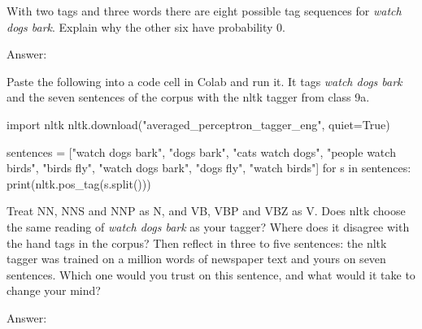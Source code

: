 \documentclass[11pt,letterpaper]{article}
\newcommand{\question}[1]{\needspace{5cm}\vspace{10pt}{\large\bfseries #1}\par\vspace{2pt}}
\begin{document}
\question{5. The other paths}

With two tags and three words there are eight possible tag sequences for \emph{watch dogs bark}. Explain why the other six have probability 0.

\par\vspace{4pt}Answer:\par\vspace{2cm}

\question{6. Comparing with nltk}

Paste the following into a code cell in Colab and run it. It tags \emph{watch dogs bark} and the seven sentences of the corpus with the nltk tagger from class 9a.

\begin{code}
import nltk
nltk.download("averaged_perceptron_tagger_eng", quiet=True)

sentences = ["watch dogs bark",
             "dogs bark", "cats watch dogs", "people watch birds", "birds fly",
             "watch dogs bark", "dogs fly", "watch birds"]
for s in sentences:
    print(nltk.pos_tag(s.split()))
\end{code}

Treat NN, NNS and NNP as N, and VB, VBP and VBZ as V. Does nltk choose the same reading of \emph{watch dogs bark} as your tagger? Where does it disagree with the hand tags in the corpus? Then reflect in three to five sentences: the nltk tagger was trained on a million words of newspaper text and yours on seven sentences. Which one would you trust on this sentence, and what would it take to change your mind?

\par\vspace{4pt}Answer:\par\vspace{4cm}
\end{document}
